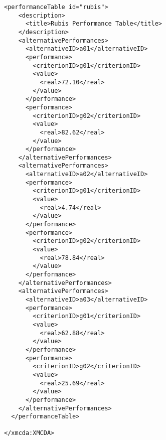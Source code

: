 \documentclass[a4paper,oneside,10 pt]{article}
\begin{document}
\begin{multicols}{2}
{\begin{lstlisting}[style=prototype, basicstyle=\tiny]
  <performanceTable id="rubis">
    <description>
      <title>Rubis Performance Table</title>
    </description>
    <alternativePerformances>
      <alternativeID>a01</alternativeID>
      <performance>
        <criterionID>g01</criterionID>
        <value>
          <real>72.10</real>
        </value>
      </performance>
      <performance>
        <criterionID>g02</criterionID>
        <value>
          <real>82.62</real>
        </value>
      </performance>
    </alternativePerformances>
    <alternativePerformances>
      <alternativeID>a02</alternativeID>
      <performance>
        <criterionID>g01</criterionID>
        <value>
          <real>4.74</real>
        </value>
      </performance>
      <performance>
        <criterionID>g02</criterionID>
        <value>
          <real>78.84</real>
        </value>
      </performance>
    </alternativePerformances>
    <alternativePerformances>
      <alternativeID>a03</alternativeID>
      <performance>
        <criterionID>g01</criterionID>
        <value>
          <real>62.88</real>
        </value>
      </performance>
      <performance>
        <criterionID>g02</criterionID>
        <value>
          <real>25.69</real>
        </value>
      </performance>
    </alternativePerformances>
  </performanceTable>
    
</xmcda:XMCDA>
\end{lstlisting}
}
\end{multicols}



\newpage
\end{document}
